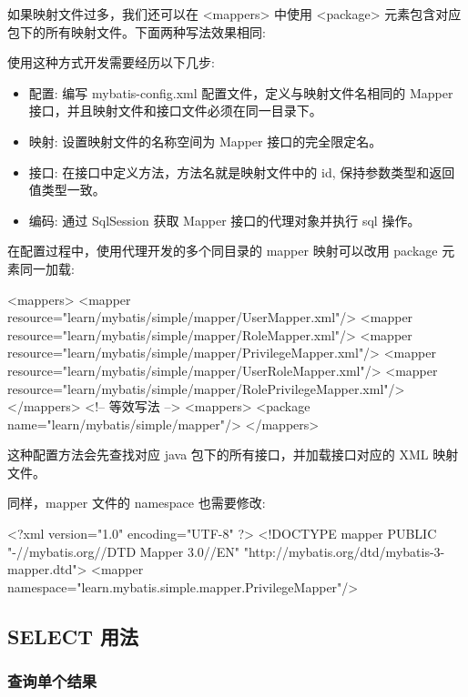 如果映射文件过多，我们还可以在 <mappers> 中使用 <package> 元素包含对应包下的所有映射文件。下面两种写法效果相同:

使用这种方式开发需要经历以下几步:
\begin{itemize}
    \item 配置: 编写 mybatis-config.xml 配置文件，定义与映射文件名相同的 Mapper 接口，并且映射文件和接口文件必须在同一目录下。
    \item 映射: 设置映射文件的名称空间为 Mapper 接口的完全限定名。
    \item 接口: 在接口中定义方法，方法名就是映射文件中的 id, 保持参数类型和返回值类型一致。
    \item 编码: 通过 SqlSession 获取 Mapper 接口的代理对象并执行 sql 操作。
\end{itemize}

在配置过程中，使用代理开发的多个同目录的 mapper 映射可以改用 package 元素同一加载:

\begin{xml}
<mappers>
    <mapper resource="learn/mybatis/simple/mapper/UserMapper.xml"/>
    <mapper resource="learn/mybatis/simple/mapper/RoleMapper.xml"/>
    <mapper resource="learn/mybatis/simple/mapper/PrivilegeMapper.xml"/>
    <mapper resource="learn/mybatis/simple/mapper/UserRoleMapper.xml"/>
    <mapper resource="learn/mybatis/simple/mapper/RolePrivilegeMapper.xml"/>
</mappers>
<!-- 等效写法 -->
<mappers>
    <package name="learn/mybatis/simple/mapper"/>
</mappers>
\end{xml}

这种配置方法会先查找对应 java 包下的所有接口，并加载接口对应的 XML 映射文件。

同样，mapper 文件的 namespace 也需要修改:

\begin{xml}
<?xml version="1.0" encoding="UTF-8" ?>
<!DOCTYPE mapper PUBLIC "-//mybatis.org//DTD Mapper 3.0//EN"
        "http://mybatis.org/dtd/mybatis-3-mapper.dtd">
<mapper namespace="learn.mybatis.simple.mapper.PrivilegeMapper"/>
\end{xml}

\subsection{SELECT 用法}

\subsubsection*{查询单个结果}

